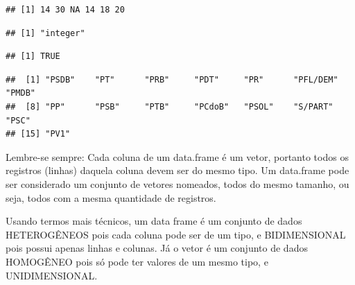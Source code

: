 \documentclass[]{book}
\newenvironment{Shaded}{\begin{snugshade}}{\end{snugshade}}
\newcommand{\KeywordTok}[1]{\textcolor[rgb]{0.13,0.29,0.53}{\textbf{#1}}}
\newcommand{\CommentTok}[1]{\textcolor[rgb]{0.56,0.35,0.01}{\textit{#1}}}
\newcommand{\OperatorTok}[1]{\textcolor[rgb]{0.81,0.36,0.00}{\textbf{#1}}}
\newcommand{\NormalTok}[1]{#1}
\begin{document}
\begin{verbatim}
## [1] 14 30 NA 14 18 20
\end{verbatim}

\begin{Shaded}
\end{Shaded}

\begin{verbatim}
## [1] "integer"
\end{verbatim}

\begin{Shaded}
\end{Shaded}

\begin{verbatim}
## [1] TRUE
\end{verbatim}

\begin{Shaded}
\end{Shaded}

\begin{verbatim}
##  [1] "PSDB"    "PT"      "PRB"     "PDT"     "PR"      "PFL/DEM" "PMDB"   
##  [8] "PP"      "PSB"     "PTB"     "PCdoB"   "PSOL"    "S/PART"  "PSC"    
## [15] "PV1"
\end{verbatim}

Lembre-se sempre: Cada coluna de um data.frame é um vetor, portanto
todos os registros (linhas) daquela coluna devem ser do mesmo tipo. Um
data.frame pode ser considerado um conjunto de vetores nomeados, todos
do mesmo tamanho, ou seja, todos com a mesma quantidade de registros.

Usando termos mais técnicos, um data frame é um conjunto de dados
HETEROGÊNEOS pois cada coluna pode ser de um tipo, e BIDIMENSIONAL pois
possui apenas linhas e colunas. Já o vetor é um conjunto de dados
HOMOGÊNEO pois só pode ter valores de um mesmo tipo, e UNIDIMENSIONAL.
\end{document}
